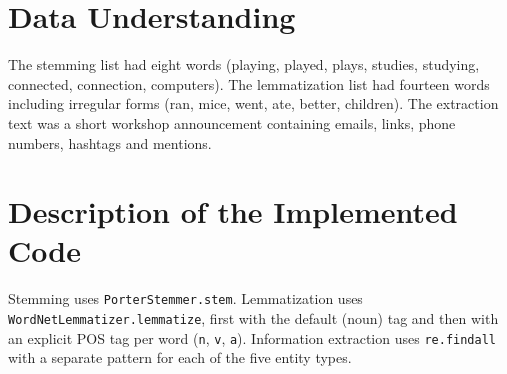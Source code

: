 \documentclass[12pt,a4paper,oneside]{report}
\begin{document}
\section{Data Understanding}
The stemming list had eight words (playing, played, plays, studies, studying, connected, connection, computers). The lemmatization list had fourteen words including irregular forms (ran, mice, went, ate, better, children). The extraction text was a short workshop announcement containing emails, links, phone numbers, hashtags and mentions.


\section{Description of the Implemented Code}
Stemming uses \texttt{PorterStemmer.stem}. Lemmatization uses \texttt{WordNetLemmatizer.lemmatize}, first with the default (noun) tag and then with an explicit POS tag per word (\texttt{n}, \texttt{v}, \texttt{a}). Information extraction uses \texttt{re.findall} with a separate pattern for each of the five entity types.
\end{document}
